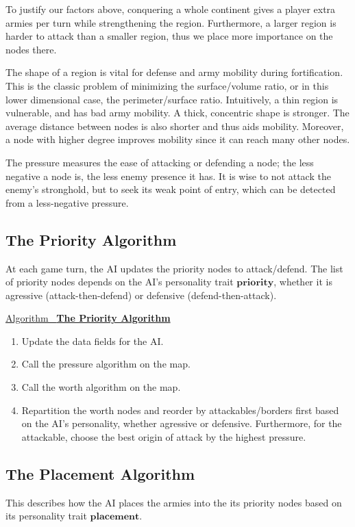 \documentclass[12pt]{article}  %
\newcommand{\algtitle}[1]{\underline{Algorithm \ {\bf #1}} \vspace*{1mm}\\}
\begin{document}
To justify our factors above, conquering a whole continent gives a player extra armies per turn while strengthening the region. Furthermore, a larger region is harder to attack than a smaller region, thus we place more importance on the nodes there. 

The shape of a region is vital for defense and army mobility during fortification. This is the classic problem of minimizing the surface/volume ratio, or in this lower dimensional case, the perimeter/surface ratio. Intuitively, a thin region is vulnerable, and has bad army mobility. A thick, concentric shape is stronger. The average distance between nodes is also shorter and thus aids mobility. Moreover, a node with higher degree improves mobility since it can reach many other nodes.

The pressure measures the ease of attacking or defending a node; the less negative a node is, the less enemy presence it has. It is wise to not attack the enemy's stronghold, but to seek its weak point of entry, which can be detected from a less-negative pressure.


\subsection{The Priority Algorithm}
At each game turn, the AI updates the priority nodes to attack/defend. The list of priority nodes depends on the AI's personality trait $\textbf{priority}$, whether it is agressive (attack-then-defend) or defensive (defend-then-attack).

\algtitle{The Priority Algorithm}
\begin{enumerate}
	\item Update the data fields for the AI.
	\item Call the pressure algorithm on the map.
	\item Call the worth algorithm on the map.
	\item Repartition the worth nodes and reorder by attackables/borders first based on the AI's personality, whether agressive or defensive. Furthermore, for the attackable, choose the best origin of attack by the highest pressure.
\end{enumerate}







\subsection{The Placement Algorithm}
This describes how the AI places the armies into the its priority nodes based on its personality trait $\textbf{placement}$.
\end{document}
